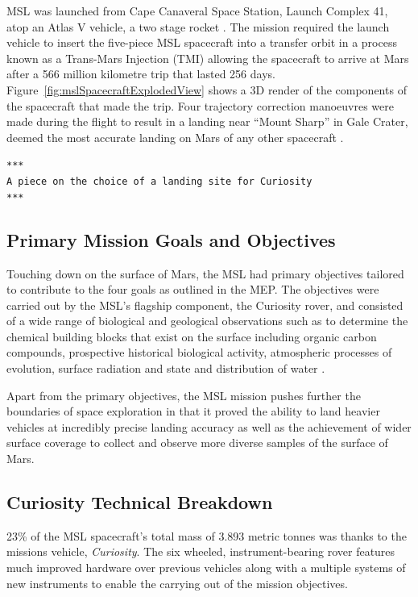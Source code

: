       
      MSL was launched from Cape Canaveral Space Station, Launch Complex 41, atop an Atlas V vehicle, a two stage rocket \cite{harwood2014sfn}. The mission required the launch vehicle to insert the five-piece MSL spacecraft into a transfer orbit in a process known as a Trans-Mars Injection (TMI) allowing the spacecraft to arrive at Mars after a 566 million kilometre trip that lasted 256 days. Figure~\ref{fig:mslSpacecraftExplodedView} shows a 3D render of the components of the spacecraft that made the trip. Four trajectory correction manoeuvres were made during the flight to result in a landing near ``Mount Sharp'' in Gale Crater, deemed the most accurate landing on Mars of any other spacecraft \cite{martinmur}.
      
      \texttt{***\\
      A piece on the choice of a landing site for Curiosity\\
      ***}
    
    \subsection{Primary Mission Goals and Objectives}
      Touching down on the surface of Mars, the MSL had primary objectives tailored to contribute to the four goals as outlined in the MEP. The objectives were carried out by the MSL's flagship component, the Curiosity rover, and consisted of a wide range of biological and geological observations such as to determine the chemical building blocks that exist on the surface including organic carbon compounds, prospective historical biological activity, atmospheric processes of evolution, surface radiation and state and distribution of water \cite{mslobjectivesjpl}.
      
      Apart from the primary objectives, the MSL mission pushes further the boundaries of space exploration in that it proved the ability to land heavier vehicles at incredibly precise landing accuracy as well as the achievement of wider surface coverage to collect and observe more diverse samples of the surface of Mars.
              
    \subsection{Curiosity Technical Breakdown}
      23\% of the MSL spacecraft's total mass of 3.893 metric tonnes was thanks to the missions vehicle, \textit{Curiosity}. The six wheeled, instrument-bearing rover features much improved hardware over previous vehicles along with a multiple systems of new instruments to enable the carrying out of the mission objectives.
      
